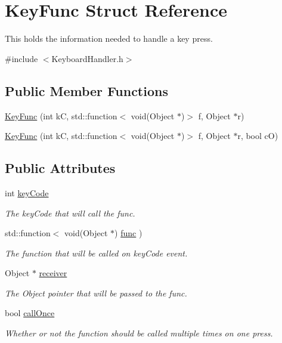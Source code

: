 \hypertarget{struct_key_func}{\section{\-Key\-Func \-Struct \-Reference}
\label{struct_key_func}
}


\-This holds the information needed to handle a key press.  




{\ttfamily \#include $<$\-Keyboard\-Handler.\-h$>$}

\subsection*{\-Public \-Member \-Functions}
\begin{DoxyCompactItemize}
\item 
\hyperlink{struct_key_func_a92e1a52bd64330f81aa24e4d0c695dd2}{\-Key\-Func} (int k\-C, std\-::function$<$ void(\-Object $\ast$)$>$ f, \-Object $\ast$r)
\item 
\hyperlink{struct_key_func_a57c47c5b2259da22995ab3ed77e0ca5c}{\-Key\-Func} (int k\-C, std\-::function$<$ void(\-Object $\ast$)$>$ f, \-Object $\ast$r, bool c\-O)
\end{DoxyCompactItemize}
\subsection*{\-Public \-Attributes}
\begin{DoxyCompactItemize}
\item 
int \hyperlink{struct_key_func_a8683decc234b65cee973ca74b2257a99}{key\-Code}
\begin{DoxyCompactList}\small\item\em \-The key\-Code that will call the func. \end{DoxyCompactList}\item 
std\-::function$<$ void(\-Object $\ast$) \hyperlink{struct_key_func_ad68d4ddeedf266bd9819f5495a159ea0}{func} )
\begin{DoxyCompactList}\small\item\em \-The function that will be called on key\-Code event. \end{DoxyCompactList}\item 
\-Object $\ast$ \hyperlink{struct_key_func_addf45cdc46b86985f56783f52cd45c6f}{receiver}
\begin{DoxyCompactList}\small\item\em \-The \-Object pointer that will be passed to the func. \end{DoxyCompactList}\item 
bool \hyperlink{struct_key_func_a258ee11a628c97256f59e59e5175a509}{call\-Once}
\begin{DoxyCompactList}\small\item\em \-Whether or not the function should be called multiple times on one press. \end{DoxyCompactList}\end{DoxyCompactItemize}


